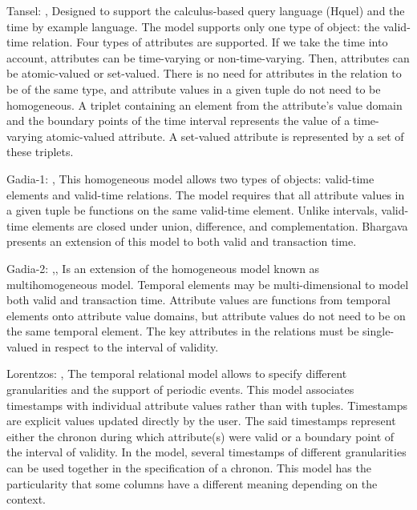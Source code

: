 Tansel: \cite{Tansel:1986:ATD:23125.23132},\cite{Clifford:1985:AHR:971699.318922} Designed to support the calculus-based query language (Hquel) and the time by example language. The model supports only one type of object: the valid-time relation. Four types of attributes are supported. If we take the time into account, attributes can be time-varying or non-time-varying. Then, attributes can be atomic-valued or set-valued. There is no need for attributes in the relation to be of the same type, and attribute values in a given tuple do not need to be homogeneous. A triplet containing an element from the attribute's value domain and the boundary points of the time interval represents the value of a time-varying atomic-valued attribute. A set-valued attribute is represented by a set of these triplets.

Gadia-1:  \cite{Gadia:1988:HRM:49346.50065},\cite{Gadia:1985:QLH:325405.325412} This homogeneous model allows two types of objects: valid-time elements and valid-time relations. The model requires that all attribute values in a given tuple be functions on the same valid-time element. Unlike intervals, valid-time elements are closed under union, difference, and complementation.
Bhargava presents an extension of this model to both valid and transaction time. 

Gadia-2: \cite{Gadia:1986:TMM:645471.655410},\cite{Chuen},\cite{Gadia:1988:GMR:971701.50233} Is an extension of the homogeneous model known as multihomogeneous model. Temporal elements may be multi-dimensional to model both valid and transaction time. Attribute values are functions from temporal elements onto attribute value domains, but attribute values do not need to be on the same temporal element. The key attributes in the relations must be single-valued in respect to the interval of validity. 

Lorentzos: \cite{springerlink:10.1007/3-540-19074-0_71},\cite{Lorentzos:1989:HDT:70777.70787} The temporal relational model allows to specify different granularities and the support of periodic events. This model associates timestamps with individual attribute values rather than with tuples. Timestamps are explicit values updated directly by the user. The said timestamps represent either the chronon during which attribute(s) were valid or a boundary point of the interval of validity. In the model, several timestamps of different granularities can be used together in the specification of a chronon.
This model has the particularity that some columns have a different meaning depending on the context.

